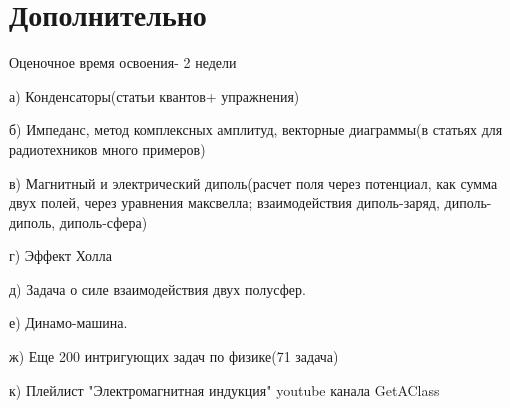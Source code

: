 \documentclass{article}
\begin{document}
\Large\section{Дополнительно}
\large{
Оценочное время освоения- 2 недели

а) Конденсаторы(статьи квантов+ упражнения)

б) Импеданс, метод комплексных амплитуд, векторные диаграммы(в статьях для радиотехников много примеров)

в) Магнитный и электрический диполь(расчет поля через потенциал, как сумма двух полей, через уравнения максвелла; взаимодействия диполь-заряд, диполь-диполь, диполь-сфера)

г) Эффект Холла

д) Задача о силе взаимодействия двух полусфер.

е) Динамо-машина.

ж) Еще 200 интригующих задач по физике(71 задача)

к) Плейлист "Электромагнитная индукция" youtube канала GetAClass
}
\end{document}
